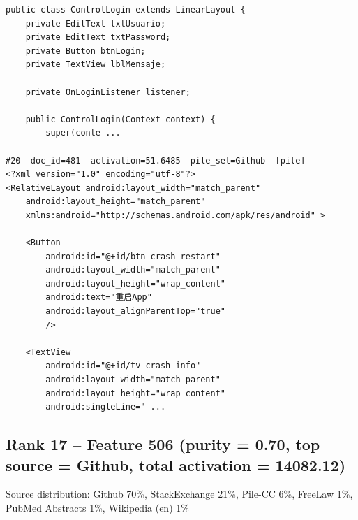 \begin{verbatim}
public class ControlLogin extends LinearLayout {
	private EditText txtUsuario;
	private EditText txtPassword;
	private Button btnLogin;
	private TextView lblMensaje;
	
	private OnLoginListener listener;
	
	public ControlLogin(Context context) {
		super(conte ...

#20  doc_id=481  activation=51.6485  pile_set=Github  [pile]
<?xml version="1.0" encoding="utf-8"?>
<RelativeLayout android:layout_width="match_parent"
    android:layout_height="match_parent"
    xmlns:android="http://schemas.android.com/apk/res/android" >

    <Button
        android:id="@+id/btn_crash_restart"
        android:layout_width="match_parent"
        android:layout_height="wrap_content"
        android:text="重启App"
        android:layout_alignParentTop="true"
        />

    <TextView
        android:id="@+id/tv_crash_info"
        android:layout_width="match_parent"
        android:layout_height="wrap_content"
        android:singleLine=" ...

\end{verbatim}

\subsection*{Rank 17 -- Feature 506 (purity = 0.70, top source = Github, total activation = 14082.12)}

Source distribution: Github 70\%, StackExchange 21\%, Pile-CC 6\%, FreeLaw 1\%, PubMed Abstracts 1\%, Wikipedia (en) 1\%

